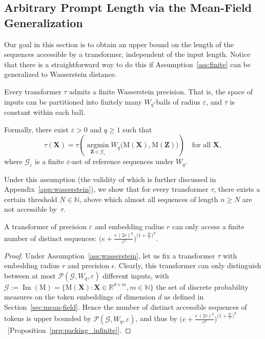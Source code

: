 \subsection{Arbitrary Prompt Length via the Mean-Field Generalization}\label{sec:wasserstein}

Our goal in this section is to obtain an upper bound on the length of the sequences accessible by a transformer, independent of the input length. Notice that there is a straightforward way to do this if Assumption~\ref{ass:finite} can be generalized to Wasserstein distance.

\begin{assumption}\label{ass:wasserstein}
Every transformer $\tau$ admits a finite Wasserstein precision. 
That is, the space of inputs can be partitioned into finitely many $W_q$-balls of radius $\varepsilon$, and $\tau$ is constant within each ball.

Formally, there exist $\varepsilon > 0$ and $q \ge 1$ such that
\[
\tau(\mathbf X) 
= \tau\!\left(\operatorname*{argmin}_{\mathbf Z \in \mathcal{G}_\varepsilon}
  W_q\big(\mathrm M(\mathbf X), \mathrm M(\mathbf Z)\big)\right)
\quad\text{for all }\mathbf X,
\]
where $\mathcal{G}_\varepsilon$ is a finite $\varepsilon$-net of reference sequences under $W_q$.
\end{assumption}


Under this assumption (the validity of which is further discussed in Appendix~\ref{app:wasserstein}), we show that for every transformer $\tau$, there exists a certain threshold $N\in\mathbb N$, above which almost all sequences of length $n\ge N$ are not accessible by~$\tau$.

\begin{theorem}\label{lem:wass}
    A transformer of precision $\varepsilon$ and embedding radius $r$ can only access a finite number of distinct sequences: $\big(e + \frac{e \, (2r)^q}{\varepsilon^q}\big)^{\big(1+\frac{2r}{\varepsilon}\big)^d}$.
\end{theorem}

\begin{proof}
    Under Assumption~\ref{ass:wasserstein}, let us fix a transformer $\tau$ with embedding radius $r$ and precision $\epsilon$. Clearly, this transformer can only distinguish between at most $\mathcal P(\mathcal{G}, W_q,\varepsilon)$ different inputs, with $\mathcal G:=\operatorname{Im}(\mathrm{M})=\{\mathrm M(\mathbf X)\colon\mathbf X\in\mathbb R^{d\times m},m\in\mathbb N\}$ the set of discrete probability measures on the token embeddings of dimension $d$ as defined in Section~\ref{sec:mean-field}. Hence the number of distinct accessible sequences of tokens is upper bounded by $\mathcal P(\mathcal{G}, W_q,\varepsilon)$, and thus by $\big(e + \frac{e \, (2r)^q}{\varepsilon^q}\big)^{\big(1+\frac{2r}{\varepsilon}\big)^d}$~[Proposition~\ref{prp:packing_infinite}].
\end{proof}


